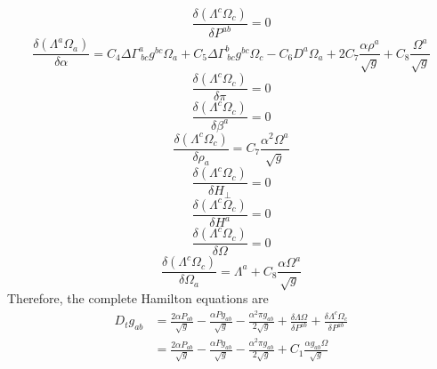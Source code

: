 \documentclass{article}
\begin{document}
\[
\frac{\delta (\Lambda^{c}\Omega_{c})}{\delta P^{ab}} = 0
\]
\[
\frac{\delta \left( \Lambda^{a} \Omega_{a}\right)}{\delta \alpha} = C_{4}\Delta \Gamma^{a}_{~bc}g^{bc}\Omega_{a} + C_{5}\Delta \Gamma^{b}_{~bc}g^{bc}\Omega_{c} - C_{6}D^{a}\Omega_{a} + 2C_{7}\frac{\alpha \rho^{a}}{\sqrt{g}} + C_{8}\frac{\Omega^{a}}{\sqrt{g}}
\]
\[
\frac{\delta \left(\Lambda^{c}\Omega_{c}\right)}{\delta \pi} = 0
\]
\[
\frac{\delta \left(\Lambda^{c}\Omega_{c}\right)}{\delta \beta^{a}} = 0
\]
\[
\frac{\delta \left(\Lambda^{c}\Omega_{c}\right)}{\delta \rho_{a}} = C_{7}\frac{\alpha^{2}\Omega^{a}}{\sqrt{g}}
\]
\[
\frac{\delta \left(\Lambda^{c}\Omega_{c}\right)}{\delta H_{\perp}} = 0
\]
\[
\frac{\delta \left(\Lambda^{c}\Omega_{c}\right)}{\delta H^{a}} = 0
\]
\[
\frac{\delta \left(\Lambda^{c}\Omega_{c}\right)}{\delta \Omega} = 0
\]
\[
\frac{\delta \left(\Lambda^{c}\Omega_{c}\right)}{\delta \Omega_{a}} = \Lambda^{a} + C_{8}\frac{\alpha \Omega^{a}}{\sqrt{g}}
\]
Therefore, the complete Hamilton equations are
\begin{align*}
D_{t}g_{ab} & = \frac{2\alpha P_{ab}}{\sqrt{g}} - \frac{\alpha P g_{ab}}{\sqrt{g}} - \frac{\alpha^{2} \pi g_{ab}}{2 \sqrt{g}} + \frac{\delta \Lambda \Omega}{\delta P^{ab}} + \frac{\delta \Lambda^{c}\Omega_{c}}{\delta P^{ab}}\\
& = \frac{2\alpha P_{ab}}{\sqrt{g}} - \frac{\alpha P g_{ab}}{\sqrt{g}} - \frac{\alpha^{2} \pi g_{ab}}{2 \sqrt{g}} + C_{1}\frac{\alpha g_{ab}\Omega}{\sqrt{g}}
\end{align*}
\end{document}
